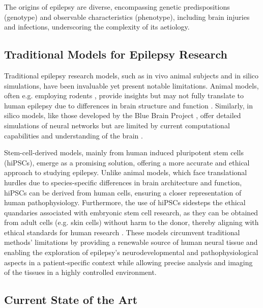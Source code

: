 \documentclass[10pt]{article}
\begin{document}
\begin{sloppypar}
  The origins of epilepsy are diverse, encompassing genetic predispositions (genotype) and observable characteristics (phenotype), including brain injuries and infections, underscoring the complexity of its aetiology.

  \subsection{Traditional Models for Epilepsy Research}
  \label{sec:traditional-models-for-epilepsy-research}

  Traditional epilepsy research models, such as in vivo animal subjects and in silico simulations, have been invaluable yet present notable limitations. Animal models, often e.g. employing rodents \citep{wang_animal_2022}, provide insights but may not fully translate to human epilepsy due to differences in brain structure and function \citep{kandratavicius_animal_2014}. Similarly, in silico models, like those developed by the Blue Brain Project \citep{markram_blue_2006}, offer detailed simulations of neural networks but are limited by current computational capabilities and understanding of the brain \citep{mirza_integrative_2016}.

  Stem-cell-derived models, mainly from human induced pluripotent stem cells (hiPSCs), emerge as a promising solution, offering a more accurate and ethical approach to studying epilepsy. Unlike animal models, which face translational hurdles due to species-specific differences in brain architecture and function, hiPSCs can be derived from human cells, ensuring a closer representation of human pathophysiology. Furthermore, the use of hiPSCs sidesteps the ethical quandaries associated with embryonic stem cell research, as they can be obtained from adult cells (e.g. skin cells) without harm to the donor, thereby aligning with ethical standards for human research \citep{takahashi_induction_2006}. These models circumvent traditional methods’ limitations by providing a renewable source of human neural tissue and enabling the exploration of epilepsy’s neurodevelopmental and pathophysiological aspects in a patient-specific context while allowing precise analysis and imaging of the tissues in a highly controlled environment.

  \subsection{Current State of the Art}
  \label{sec:current-state-of-the-art}


\end{sloppypar}
\end{document}
